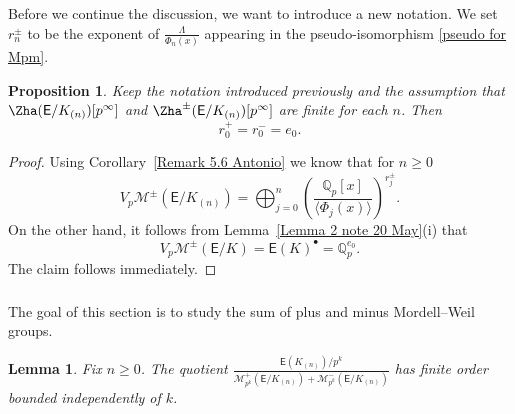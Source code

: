 \documentclass{amsart}
\newtheorem{lemma}[theorem]{Lemma}
\newtheorem{proposition}[theorem]{Proposition}
\numberwithin{equation}{section}
\theoremstyle{remark}
\newcommand{\EC}{\mathsf{E}}
\newcommand{\cM}{\mathcal{M}}
\newcommand{\Qp}{\mathbb{Q}_p}
\theoremstyle{plain} %
\begin{document}
Before we continue the discussion, we want to introduce a new notation.
We set $r_n^{\pm}$ to be the exponent of $\frac{\Lambda}{\Phi_n(x)}$ appearing in the pseudo-isomorphism \eqref{pseudo for Mpm}.

\begin{proposition}
Keep the notation introduced previously and the assumption that $\Zha(\EC/K_{(n)})[p^\infty]$ and $\Zha^{\pm}(\EC/K_{(n)})[p^\infty]$ are finite for each $n$.
Then
\[
r_0^+ = r_0^- = e_0.
\]
\end{proposition}

\begin{proof}
Using Corollary~\ref{Remark 5.6 Antonio} we know that for $n\geq 0$
\[
V_p \cM^{\pm}(\EC/K_{(n)}) = \bigoplus_{j=0}^n \left( \frac{\Qp[x]}{\langle \Phi_j(x) \rangle}\right)^{r_j^{\pm}}.
\]
On the other hand, it follows from Lemma~\ref{Lemma 2 note 20 May}(i) that
\[
V_p\cM^{\pm}(\EC/K) = \EC(K)^{\bullet} = \Qp^{e_0}.
\]
The claim follows immediately.
\end{proof}

\subsubsection{}
The goal of this section is to study the sum of plus and minus Mordell--Weil groups.

\begin{lemma}
\label{bounded growth}
Fix $n \geq 0$.
The quotient $\frac{\EC(K_{(n)})/p^k}{\cM^{+}_{p^k}(\EC/K_{(n)}) + \cM^{-}_{p^k}(\EC/K_{(n)}) }$ has finite order bounded independently of $k$.
\end{lemma}
\end{document}
